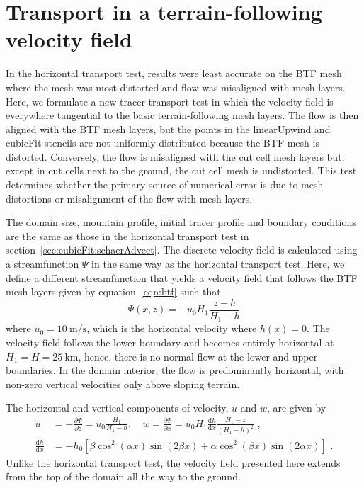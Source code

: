 \section{Transport in a terrain-following velocity field}
\label{sec:cubicFit:tfAdvect}

In the horizontal transport test, results were least accurate on the BTF mesh where the mesh was most distorted and flow was misaligned with mesh layers.
Here, we formulate a new tracer transport test in which the velocity field is everywhere tangential to the basic terrain-following mesh layers.
The flow is then aligned with the BTF mesh layers, but the points in the linearUpwind and cubicFit stencils are not uniformly distributed because the BTF mesh is distorted.
Conversely, the flow is misaligned with the cut cell mesh layers but, except in cut cells next to the ground, the cut cell mesh is undistorted.
This test determines whether the primary source of numerical error is due to mesh distortions or misalignment of the flow with mesh layers.

The domain size, mountain profile, initial tracer profile and boundary conditions are the same as those in the horizontal transport test in section~\ref{sec:cubicFit:schaerAdvect}.
The discrete velocity field is calculated using a streamfunction $\Psi$ in the same way as the horizontal transport test.
Here, we define a different streamfunction that yields a velocity field that follows the BTF mesh layers given by equation~\eqref{eqn:btf} such that
\begin{equation}
	\Psi(x,z) = -u_0 H_1 \frac{z - h}{H_1 - h} \label{eqn:streamfunc-btf}
\end{equation}
where $u_0 = \SI{10}{\meter\per\second}$, which is the horizontal velocity where $h(x) = 0$.
The velocity field follows the lower boundary and becomes entirely horizontal at $H_1 = H = \SI{25}{\kilo\meter}$, hence, there is no normal flow at the lower and upper boundaries.
In the domain interior, the flow is predominantly horizontal, with non-zero vertical velocities only above sloping terrain.

The horizontal and vertical components of velocity, $u$ and $w$, are given by
\begin{align}
	u &= -\frac{\partial \Psi}{\partial z} = u_0 \frac{H_1}{H_1 - h}, \quad w = \frac{\partial \Psi}{\partial x} = u_0 H_1 \frac{\mathrm{d} h}{\mathrm{d} x} \frac{H_1 - z}{\left( H_1 - h \right)^2} \label{eqn:slanted:uw-btf} \text{ ,}\\
	\frac{\mathrm{d} h}{\mathrm{d} x} &= - h_0 \left[ 
		\beta \cos^2 \left( \alpha x \right) \sin \left( 2 \beta x \right) +
		\alpha \cos^2 \left( \beta x \right) \sin \left( 2 \alpha x \right)
	\right] \text{ .}
\end{align}
Unlike the horizontal transport test, the velocity field presented here extends from the top of the domain all the way to the ground.


